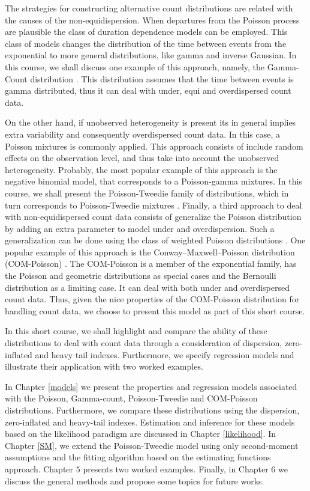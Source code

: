 \documentclass[9pt,a5paper,]{book}
\theoremstyle{definition}
\theoremstyle{definition}
\theoremstyle{remark}
\begin{document}
The strategies for constructing alternative count distributions are
related with the causes of the non-equidispersion. When departures from
the Poisson process are plausible the class of duration dependence
models \citep{Winkelmann2003} can be employed. This class of models
changes the distribution of the time between events from the exponential
to more general distributions, like gamma and inverse Gaussian. In this
course, we shall discuss one example of this approach, namely, the
Gamma-Count distribution \citep{Zeviani2014}. This distribution assumes
that the time between events is gamma distributed, thus it can deal with
under, equi and overdispersed count data.

On the other hand, if unobserved heterogeneity is present its in general
implies extra variability and consequently overdispersed count data. In
this case, a Poisson mixtures is commonly applied. This approach
consists of include random effects on the observation level, and thus
take into account the unobserved heterogeneity. Probably, the most
popular example of this approach is the negative binomial model, that
corresponds to a Poisson-gamma mixtures. In this course, we shall
present the Poisson-Tweedie family of distributions, which in turn
corresponds to Poisson-Tweedie mixtures
\citep{Bonat2016b, Jorgensen2014}. Finally, a third approach to deal
with non-equidispersed count data consists of generalize the Poisson
distribution by adding an extra parameter to model under and
overdispersion. Such a generalization can be done using the class of
weighted Poisson distributions \citep{DelCastillo1998}. One popular
example of this approach is the Conway--Maxwell--Poisson distribution
(COM-Poisson) \citep{Sellers2010}. The COM-Poisson is a member of the
exponential family, has the Poisson and geometric distributions as
special cases and the Bernoulli distribution as a limiting case. It can
deal with both under and overdispersed count data. Thus, given the nice
properties of the COM-Poisson distribution for handling count data, we
choose to present this model as part of this short course.

In this short course, we shall highlight and compare the ability of
these distributions to deal with count data through a consideration of
dispersion, zero-inflated and heavy tail indexes. Furthermore, we
specify regression models and illustrate their application with two
worked examples.

In Chapter \ref{models} we present the properties and regression models
associated with the Poisson, Gamma-count, Poisson-Tweedie and
COM-Poisson distributions. Furthermore, we compare these distributions
using the dispersion, zero-inflated and heavy-tail indexes. Estimation
and inference for these models based on the likelihood paradigm are
discussed in Chapter \ref{likelihood}. In Chapter \ref{SM}, we extend
the Poisson-Tweedie model using only second-moment assumptions and the
fitting algorithm based on the estimating functions approach. Chapter
\(5\) presents two worked examples. Finally, in Chapter \(6\) we discuss
the general methods and propose some topics for future works.
\end{document}

